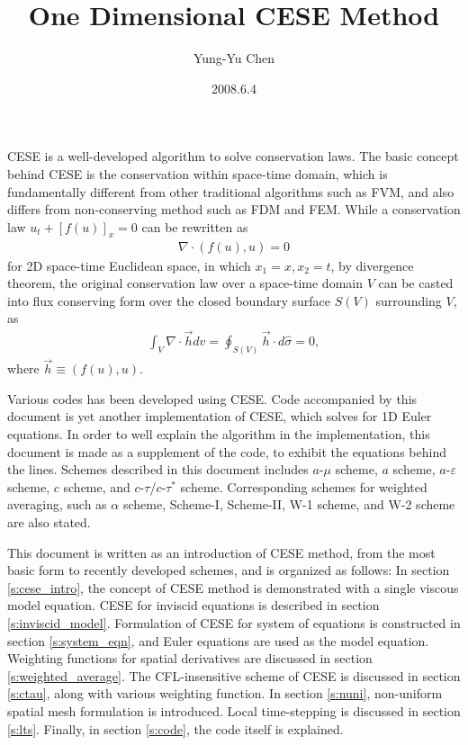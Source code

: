 \documentclass[letterpaper,12pt,dvips]{article}
\numberwithin{equation}{section}
\begin{document}
\title{One Dimensional CESE Method}
\author{Yung-Yu Chen}
\date{2008.6.4}

\maketitle

\tableofcontents

\hspace{.5cm}

CESE is a well-developed algorithm to solve conservation laws.
The basic concept behind CESE is the conservation within space-time domain, 
which is fundamentally different from other traditional 
algorithms such as FVM, and also differs from non-conserving method such 
as FDM and FEM\cite{b:chang95}.
While a conservation law $u_t+[f(u)]_x=0$ can be rewritten as 
\begin{align*}
  \nabla\cdot(f(u),u) = 0
\end{align*}
for 2D space-time Euclidean space, in which $x_1=x,x_2=t$, by divergence 
theorem, the original conservation law over a space-time domain $V$ can 
be casted into flux conserving form over the closed boundary surface $S(V)$ 
surrounding $V$, as 
\begin{align*}
  \int_V\nabla\cdot\vec{h}dv = \oint_{S(V)}\vec{h}\cdot d\hat{\sigma} = 0, 
\end{align*}
where $\vec{h}\equiv(f(u),u)$.

Various codes has been developed using CESE\cite{b:chang95}.
Code accompanied by this document is yet another implementation of CESE, 
which solves for 1D Euler equations.
In order to well explain the algorithm in the implementation, this 
document is made as a supplement of the code, to exhibit the equations 
behind the lines.
Schemes described in this document includes $a$-$\mu$ scheme, $a$ scheme, 
$a$-$\varepsilon$ scheme\cite{b:chang95}, $c$ scheme, and 
$c$-$\tau$/$c$-$\tau^*$ scheme\cite{b:chang03}.
Corresponding schemes for weighted averaging, such as $\alpha$ 
scheme\cite{b:chang95}, Scheme-I, Scheme-II\cite{b:chang02}, W-1 scheme, 
and W-2 scheme\cite{b:chang03} are also stated.

This document is written as an introduction of CESE method, from the most 
basic form to recently developed schemes, and is organized as follows:
In section \ref{s:cese_intro}, the concept of CESE method is 
demonstrated with a single viscous model equation.
CESE for inviscid equations is described in section 
\ref{s:inviscid_model}.
Formulation of CESE for system of equations is constructed in section
\ref{s:system_eqn}, and Euler equations are used as the model equation.
Weighting functions for spatial derivatives are discussed in section 
\ref{s:weighted_average}.
The CFL-insensitive scheme of CESE is discussed in section \ref{s:ctau}, 
along with various weighting function.
In section \ref{s:nuni}, non-uniform spatial mesh formulation is 
introduced.
Local time-stepping is discussed in section \ref{s:lts}.
Finally, in section \ref{s:code}, the code itself is explained.
\end{document}
